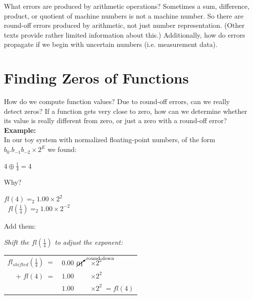 \documentclass[a4paper,12pt]{report}
\begin{document}
	What errors are produced by arithmetic operations?  Sometimes a sum, difference, product, or 
	quotient of machine numbers is not a machine number. So there are round-off errors produced by 
	arithmetic, not just number representation. (Other texts provide rather limited information about 
	this.) Additionally, how do errors propagate if we begin with uncertain numbers (i.e. measurement 
	data). \\

\section{Finding Zeros of Functions}

	How do we compute function values? Due to round-off errors, can we really detect zeros? If a 
	function gets very close to zero, how can we determine whether its value is really different from 
	zero, or just a zero with a round-off error?\\

	\noindent \textbf{Example:}\medskip\\
	
	\noindent In our toy system with normalized floating-point numbers, of the form 
	$b_0.b_{-1}b_{-2}\times 2^E$ we found:

\begin{center}
	$4\oplus \frac{1}{4} = 4$\\
	\bigskip
\end{center}

	Why?

\begin{center}
	$fl(4)=_2 1.00\times 2^2$\\
	\medskip
	$\; \; fl(\frac{1}{4})=_2 1.00\times 2^{-2}$
\end{center}

	Add them:

\begin{center}
	\textit{Shift the $fl(\frac{1}{4})$ to adjust the exponent:}\\
	\medskip
\begin{tabular}{rcll}
	$fl_{shifted}(\frac{1}{4})\;=$ & $\!\!0.00$ & $\!\!\!\!\cancelto{\text{round down}}{01}$ & $\times 2^2$\\
	$+ \; fl(4)\;=$ & $\!\!1.00$ & & $\times 2^2$\\
	\hline
	& $\!\!1.00$ & & $\times 2^2 \; = fl(4)$\\
\end{tabular}
\end{center}
	\bigskip
\end{document}
